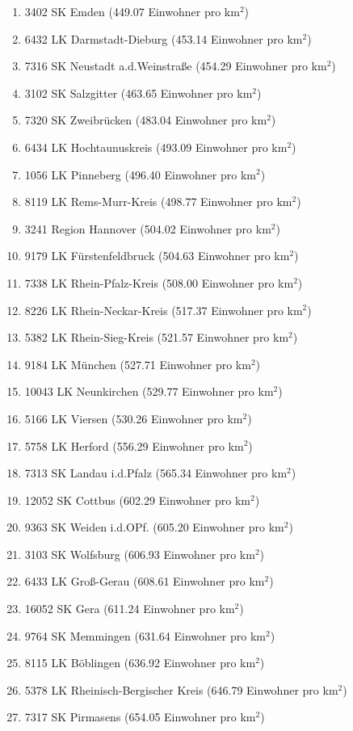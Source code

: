 \begin{enumerate}[itemsep=-6mm]
\item 3402 SK Emden (449.07 Einwohner pro km$^2$)
\item 6432 LK Darmstadt-Dieburg (453.14 Einwohner pro km$^2$)
\item 7316 SK Neustadt a.d.Weinstraße (454.29 Einwohner pro km$^2$)
\item 3102 SK Salzgitter (463.65 Einwohner pro km$^2$)
\item 7320 SK Zweibrücken (483.04 Einwohner pro km$^2$)
\item 6434 LK Hochtaunuskreis (493.09 Einwohner pro km$^2$)
\item 1056 LK Pinneberg (496.40 Einwohner pro km$^2$)
\item 8119 LK Rems-Murr-Kreis (498.77 Einwohner pro km$^2$)
\item 3241 Region Hannover (504.02 Einwohner pro km$^2$)
\item 9179 LK Fürstenfeldbruck (504.63 Einwohner pro km$^2$)
\item 7338 LK Rhein-Pfalz-Kreis (508.00 Einwohner pro km$^2$)
\item 8226 LK Rhein-Neckar-Kreis (517.37 Einwohner pro km$^2$)
\item 5382 LK Rhein-Sieg-Kreis (521.57 Einwohner pro km$^2$)
\item 9184 LK München (527.71 Einwohner pro km$^2$)
\item 10043 LK Neunkirchen (529.77 Einwohner pro km$^2$)
\item 5166 LK Viersen (530.26 Einwohner pro km$^2$)
\item 5758 LK Herford (556.29 Einwohner pro km$^2$)
\item 7313 SK Landau i.d.Pfalz (565.34 Einwohner pro km$^2$)
\item 12052 SK Cottbus (602.29 Einwohner pro km$^2$)
\item 9363 SK Weiden i.d.OPf. (605.20 Einwohner pro km$^2$)
\item 3103 SK Wolfsburg (606.93 Einwohner pro km$^2$)
\item 6433 LK Groß-Gerau (608.61 Einwohner pro km$^2$)
\item 16052 SK Gera (611.24 Einwohner pro km$^2$)
\item 9764 SK Memmingen (631.64 Einwohner pro km$^2$)
\item 8115 LK Böblingen (636.92 Einwohner pro km$^2$)
\item 5378 LK Rheinisch-Bergischer Kreis (646.79 Einwohner pro km$^2$)
\item 7317 SK Pirmasens (654.05 Einwohner pro km$^2$)

\end{enumerate}
